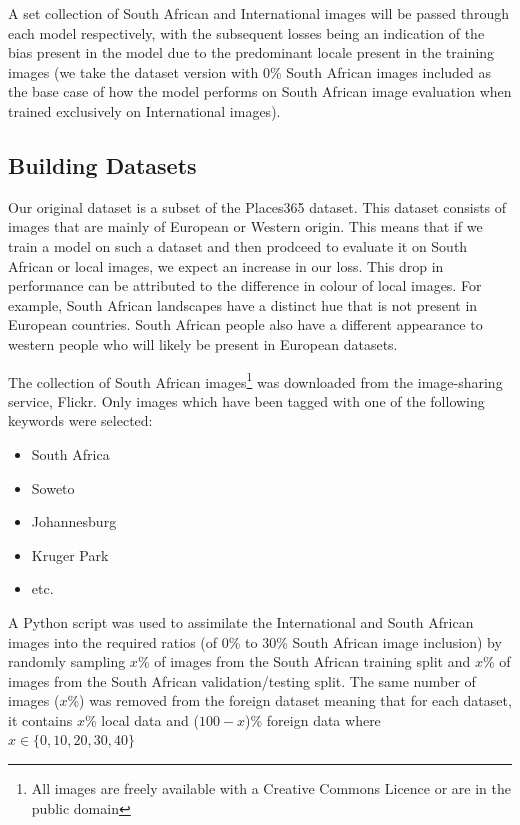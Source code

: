 \documentclass[conference]{IEEEtran}
\begin{document}
A set collection of South African and International images will be passed through each model respectively, with the subsequent losses being an indication of the bias present in the model due to the predominant locale present in the training images (we take the dataset version with 0\% South African images included as the base case of how the model performs on South African image evaluation when trained exclusively on International images).

\subsection{Building Datasets}

Our original dataset is a subset of the Places365 dataset. This dataset consists of images that are mainly of European or Western origin. This means that if we train a model on such a dataset and then prodceed to evaluate it on South African or local images, we expect an increase in our loss. This drop in performance can be attributed to the difference in colour of local images. For example, South African landscapes have a distinct hue that is not present in European countries. South African people also have a different appearance to western people who will likely be present in European datasets.

The collection of South African images\footnote{All images are freely available with a Creative Commons Licence or are in the public domain} was downloaded from the image-sharing service, Flickr. Only images which have been tagged with one of the following keywords were selected:

\begin{itemize}
	\item South Africa
	\item Soweto
	\item Johannesburg
	\item Kruger Park
	\item etc.
\end{itemize}

A Python script was used to assimilate the International and South African images into the required ratios (of 0\% to 30\% South African image inclusion) by randomly sampling $x$\% of images from the South African training split and $x$\% of images from the South African validation/testing split. The same number of images ($x$\%) was removed from the foreign dataset meaning that for each dataset, it contains $x$\% local data and ($100 - x$)\% foreign data where $x\in\{0, 10, 20, 30, 40\}$
\end{document}
